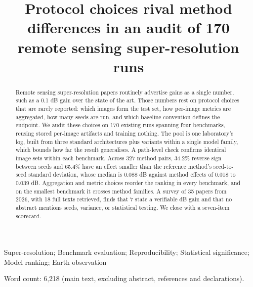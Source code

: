 \documentclass{interact}
\begin{document}

\title{Protocol choices rival method differences in an audit of 170 remote sensing super-resolution runs}

\author{}

\maketitle

\begin{abstract}
Remote sensing super-resolution papers routinely advertise gains as a single number, such as a 0.1 dB gain over the state of the art. Those numbers rest on protocol choices that are rarely reported: which images form the test set, how per-image metrics are aggregated, how many seeds are run, and which baseline convention defines the endpoint. We audit these choices on 170 existing runs spanning four benchmarks, reusing stored per-image artifacts and training nothing. The pool is one laboratory's log, built from three standard architectures plus variants within a single model family, which bounds how far the result generalises. A path-level check confirms identical image sets within each benchmark. Across 327 method pairs, 34.2\% reverse sign between seeds and 65.4\% have an effect smaller than the reference method's seed-to-seed standard deviation, whose median is 0.088 dB against method effects of 0.018 to 0.039 dB. Aggregation and metric choices reorder the ranking in every benchmark, and on the smallest benchmark it crosses method families. A survey of 35 papers from 2026, with 18 full texts retrieved, finds that 7 state a verifiable dB gain and that no abstract mentions seeds, variance, or statistical testing. We close with a seven-item scorecard.
\end{abstract}

\begin{keywords}
Super-resolution; Benchmark evaluation; Reproducibility; Statistical significance; Model ranking; Earth observation
\end{keywords}

\noindent\small Word count: 6,218 (main text, excluding abstract,
references and declarations).
\end{document}
